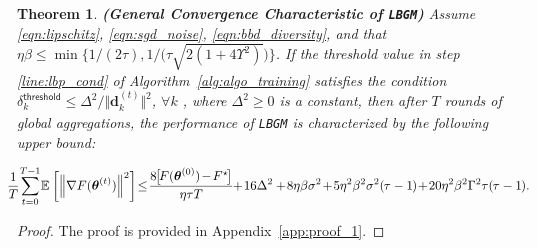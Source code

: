 \documentclass{article}
\newtheorem{theorem}{Theorem}
\newcommand{\E}[2]{\mathbb{E}_{#2}\left[#1\right]}
\renewcommand{\vec}[3]{\boldsymbol{#1}_{#2}^{#3}}
\newcommand{\norm}[2]{\left\Vert#1\right\Vert_{#2}}
\newcommand{\innorm}[2]{\Vert #1\Vert_{#2}}
\newcommand{\aligneqn}[1]{{\begin{align}#1\end{align}}}
\newcommand{\algName}{{\tt LBGM}}
\begin{document}
\begin{theorem}
\label{thm:conv_char}
\textbf{(General Convergence Characteristic of {\algName})} 
    Assume \ref{eqn:lipschitz}, \ref{eqn:sgd_noise}, \ref{eqn:bbd_diversity}, and that $\eta\beta \leq \min\big\{ 1/(2\tau), 1/\big(\tau\sqrt{2(1+4\Upsilon^2)}\big) \big\}$.
    If the threshold value in step \ref{line:lbp_cond} of Algorithm~\ref{alg:algo_training} satisfies the condition $\delta^{\mathsf{threshold}}_k \leq \Delta^2/\innorm{\vec{d}{k}{(t)}}{}^2$, $\forall k$ 
    , where $\Delta^2\geq 0$ is a constant, then after $T$ rounds of global aggregations, the performance of {\algName} is characterized by the following upper bound:
    \vspace{-6mm}
    
{\small    
\aligneqn{
    \hspace{-3mm}\frac{1}{T}\hspace{-0.45mm} \sum_{t=0}^{T-1} \hspace{-0.45mm}\E{\norm{\nabla F(\vec{\theta}{}{(t)})}{}^2}{} \hspace{-0.65mm} \leq \hspace{-0.65mm}\frac{8\hspace{-0.35mm}\big[\hspace{-0.45mm}F(\vec{\theta}{}{(0)})\hspace{-0.45mm} -\hspace{-0.45mm} F^\star\hspace{-0.45mm}\big]}{\eta\tau T}\hspace{-0.5mm} \hspace{-0.5mm}+ \hspace{-0.5mm} 16 \Delta^2 +\hspace{-0.5mm} 8\eta\beta\sigma^2  \hspace{-0.5mm}+ \hspace{-0.5mm} 5\eta^2\beta^2\sigma^2(\hspace{-0.2mm}\tau-1\hspace{-0.2mm}) \hspace{-0.55mm}+ \hspace{-0.55mm}20 \eta^2\beta^2 \Gamma^2 \tau(\hspace{-0.2mm}\tau-1\hspace{-0.2mm}).\hspace{-3mm}
    \label{eqn:thm_conv_char}
}}
\end{theorem}
\vspace{-3mm}
\vspace{-0.05in}
\begin{proof} The proof is provided in Appendix~\ref{app:proof_1}.
\end{proof}
\vspace{-0.1in}
\end{document}
